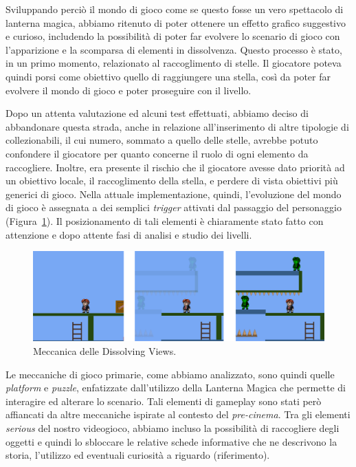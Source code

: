 Sviluppando perciò il mondo di gioco come se questo fosse un vero spettacolo di lanterna magica, abbiamo ritenuto di poter ottenere un effetto grafico suggestivo e curioso, includendo la possibilità di poter far evolvere lo scenario di gioco con l’apparizione e la scomparsa di elementi in dissolvenza.
Questo processo è stato, in un primo momento, relazionato al raccoglimento di stelle. Il giocatore poteva quindi porsi come obiettivo quello di raggiungere una stella, così da poter far evolvere il mondo di gioco e poter proseguire con il livello.

Dopo un attenta valutazione ed alcuni test effettuati, abbiamo deciso di abbandonare questa strada, anche in relazione all’inserimento di altre tipologie di collezionabili, il cui numero, sommato a quello delle stelle, avrebbe potuto confondere il giocatore per quanto concerne il ruolo di ogni elemento da raccogliere. Inoltre, era presente il rischio che il giocatore avesse dato priorità ad un obiettivo locale, il raccoglimento della stella, e perdere di vista obiettivi più generici di gioco.
Nella attuale implementazione, quindi, l’evoluzione del mondo di gioco è assegnata a dei semplici \textit{trigger} attivati dal passaggio del personaggio (Figura~\ref{fig:meccaniche_precinema_dissolving}). Il posizionamento di tali elementi è chiaramente stato fatto con attenzione e dopo attente fasi di analisi e studio dei livelli.

\begin{figure}%
	\centering
	\includegraphics[width= \columnwidth]{images/gameDesign/22.jpg}
	\caption{Meccanica delle Dissolving Views.}
	\label{fig:meccaniche_precinema_dissolving}
\end{figure} 

Le meccaniche di gioco primarie, come abbiamo analizzato, sono quindi quelle \textit{platform} e \textit{puzzle}, enfatizzate dall’utilizzo della Lanterna Magica che permette di interagire ed alterare lo scenario.
Tali elementi di gameplay sono stati però affiancati da altre meccaniche ispirate al contesto del \textit{pre-cinema}.
Tra gli elementi \textit{serious} del nostro videogioco, abbiamo incluso la possibilità di raccogliere degli oggetti e quindi lo sbloccare le relative schede informative che ne descrivono la storia, l’utilizzo ed eventuali curiosità a riguardo (riferimento).

